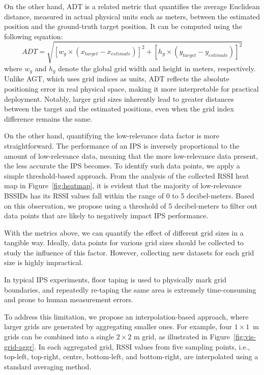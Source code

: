 \documentclass[runningheads]{llncs}
\begin{document}
On the other hand, ADT is a related metric that quantifies the average Euclidean distance, measured in actual physical units such as meters, between the estimated position and the ground-truth target position. It can be computed using the following equation:
\begin{equation}
        ADT = \sqrt{[w_{g} \times (x_{target} - x_{estimate})]^2 + [h_{g} \times (y_{target} - y_{estimate})]^2}
\end{equation}
where $w_{g}$ and $h_{g}$ denote the global grid width and height in meters, respectively. Unlike AGT, which uses grid indices as units, ADT reflects the absolute positioning error in real physical space, making it more interpretable for practical deployment. Notably, larger grid sizes inherently lead to greater distances between the target and the estimated positions, even when the grid index difference remains the same.

On the other hand, quantifying the low-relevance data factor is more straightforward. The performance of an IPS is inversely proportional to the amount of low-relevance data, meaning that the more low-relevance data present, the less accurate the IPS becomes. To identify such data points, we apply a simple threshold-based approach. From the analysis of the collected RSSI heat map in Figure~\ref{fig:heatmap}, it is evident that the majority of low-relevance BSSIDs has its RSSI values fall within the range of 0 to 5 decibel-meters. Based on this observation, we propose using a threshold of 5 decibel-meters to filter out data points that are likely to negatively impact IPS performance.

With the metrics above, we can quantify the effect of different grid sizes in a tangible way. Ideally, data points for various grid sizes should be collected to study the influence of this factor. However, collecting new datasets for each grid size is highly impractical.

In typical IPS experiments, floor taping is used to physically mark grid boundaries, and repeatedly re-taping the same area is extremely time-consuming and prone to human measurement errors.
 
To address this limitation, we propose an interpolation-based approach, where larger grids are generated by aggregating smaller ones. For example, four $1 \times 1$~m grids can be combined into a single $2 \times 2$ m grid, as illustrated in Figure~\ref{fig:vis-grid-aggr}. In each aggregated grid, RSSI values from five sampling points, i.e., top-left, top-right, centre, bottom-left, and bottom-right, are interpolated using a standard averaging method.
\end{document}
